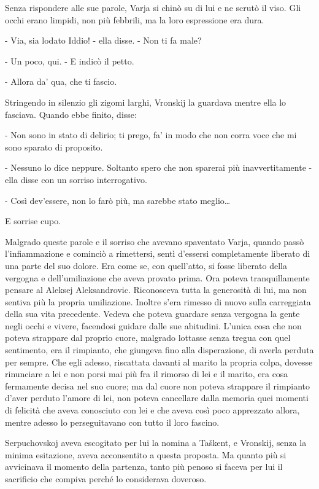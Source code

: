 Senza rispondere alle sue parole, Varja si chinò su di lui e ne scrutò il viso. Gli occhi erano limpidi, non più febbrili, ma la loro espressione era dura. 

- Via, sia lodato Iddio! - ella disse. - Non ti fa male? 

- Un poco, qui. - E indicò il petto. 

- Allora da' qua, che ti fascio. 

Stringendo in silenzio gli zigomi larghi, Vronskij la guardava mentre ella lo fasciava. Quando ebbe finito, disse: 

- Non sono in stato di delirio; ti prego, fa' in modo che non corra voce che mi sono sparato di proposito. 

- Nessuno lo dice neppure. Soltanto spero che non sparerai più inavvertitamente - ella disse con un sorriso interrogativo. 

- Così dev'essere, non lo farò più, ma sarebbe stato meglio\ldots{} 

E sorrise cupo. 

Malgrado queste parole e il sorriso che avevano spaventato Varja, quando passò l'infiammazione e cominciò a rimettersi, sentì d'essersi completamente liberato di una parte del suo dolore. Era come se, con quell'atto, si fosse liberato della vergogna e dell'umiliazione che aveva provato prima. Ora poteva tranquillamente pensare al Aleksej Aleksandrovic. Riconosceva tutta la generosità di lui, ma non sentiva più la propria umiliazione. Inoltre s'era rimesso di nuovo sulla carreggiata della sua vita precedente. Vedeva che poteva guardare senza vergogna la gente negli occhi e vivere, facendosi guidare dalle sue abitudini. L'unica cosa che non poteva strappare dal proprio cuore, malgrado lottasse senza tregua con quel sentimento, era il rimpianto, che giungeva fino alla disperazione, di averla perduta per sempre. Che egli adesso, riscattata davanti al marito la propria colpa, dovesse rinunciare a lei e non porsi mai più fra il rimorso di lei e il marito, era cosa fermamente decisa nel suo cuore; ma dal cuore non poteva strappare il rimpianto d'aver perduto l'amore di lei, non poteva cancellare dalla memoria quei momenti di felicità che aveva conosciuto con lei e che aveva così poco apprezzato allora, mentre adesso lo perseguitavano con tutto il loro fascino. 

Serpuchovskoj aveva escogitato per lui la nomina a Taškent, e Vronskij, senza la minima esitazione, aveva acconsentito a questa proposta. Ma quanto più si avvicinava il momento della partenza, tanto più penoso si faceva per lui il sacrificio che compiva perché lo considerava doveroso. 


